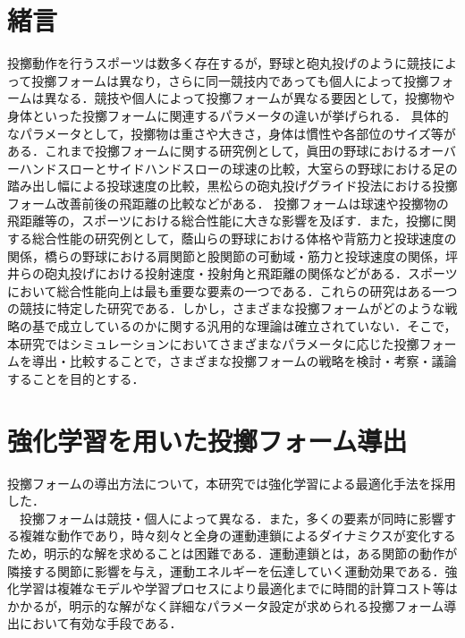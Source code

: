 \begin{small}

\section{緒言}
投擲動作を行うスポーツは数多く存在するが，野球と砲丸投げのように競技によって投擲フォームは異なり，さらに同一競技内であっても個人によって投擲フォームは異なる．競技や個人によって投擲フォームが異なる要因として，投擲物や身体といった投擲フォームに関連するパラメータの違いが挙げられる．
具体的なパラメータとして，投擲物は重さや大きさ，身体は慣性や各部位のサイズ等がある．これまで投擲フォームに関する研究例として，眞田の野球におけるオーバーハンドスローとサイドハンドスローの球速の比較\cite{sanada}，大室らの野球における足の踏み出し幅による投球速度の比較\cite{omuro}，黒松らの砲丸投げグライド投法における投擲フォーム改善前後の飛距離の比較\cite{kuromatsu}などがある．
投擲フォームは球速や投擲物の飛距離等の，スポーツにおける総合性能に大きな影響を及ぼす．また，投擲に関する総合性能の研究例として，蔭山らの野球における体格や背筋力と投球速度の関係\cite{kageyama}，橋らの野球における肩関節と股関節の可動域・筋力と投球速度の関係\cite{takahashi}，坪井らの砲丸投げにおける投射速度・投射角と飛距離の関係\cite{tsuboi}などがある．スポーツにおいて総合性能向上は最も重要な要素の一つである．これらの研究はある一つの競技に特定した研究である．しかし，さまざまな投擲フォームがどのような戦略の基で成立しているのかに関する汎用的な理論は確立されていない．そこで，本研究ではシミュレーションにおいてさまざまなパラメータに応じた投擲フォームを導出・比較することで，さまざまな投擲フォームの戦略を検討・考察・議論することを目的とする．\\
\section{強化学習を用いた投擲フォーム導出}
投擲フォームの導出方法について，本研究では強化学習による最適化手法を採用した．\\
　投擲フォームは競技・個人によって異なる．また，多くの要素が同時に影響する複雑な動作であり，時々刻々と全身の運動連鎖\cite{iwasako}\cite{burkhart}によるダイナミクスが変化するため，明示的な解を求めることは困難である．運動連鎖とは，ある関節の動作が隣接する関節に影響を与え，運動エネルギーを伝達していく運動効果である．強化学習は複雑なモデルや学習プロセスにより最適化までに時間的計算コスト等はかかるが，明示的な解がなく詳細なパラメータ設定が求められる投擲フォーム導出において有効な手段である．

\end{small}
